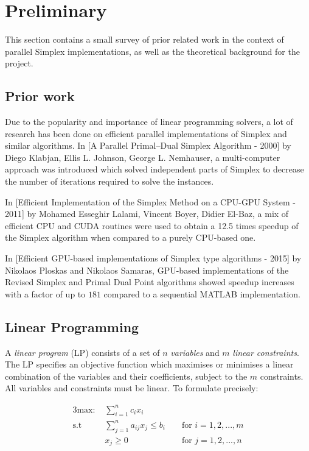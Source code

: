 \section{Preliminary}

This section contains a small survey of prior related work in the context of parallel Simplex implementations, as well as the theoretical background for the project.

\subsection{Prior work}\label{priorwork}
Due to the popularity and importance of linear programming solvers, a lot of research has been done on efficient parallel implementations of Simplex and similar algorithms. In [A Parallel Primal–Dual Simplex Algorithm - 2000] by Diego Klabjan, Ellis L. Johnson, George L. Nemhauser, a multi-computer approach was introduced which solved independent parts of Simplex to decrease the number of iterations required to solve the instances.

In [Efficient Implementation of the Simplex Method on a CPU-GPU System - 2011] by Mohamed Esseghir Lalami, Vincent Boyer, Didier El-Baz, a mix of efficient CPU and CUDA routines were used to obtain a 12.5 times speedup of the Simplex algorithm when compared to a purely CPU-based one.

In [Efficient GPU-based implementations of Simplex type algorithms - 2015] by Nikolaos Ploskas and Nikolaos Samaras, GPU-based implementations of the Revised Simplex and Primal Dual Point algorithms showed speedup increases with a factor of up to $181$ compared to a sequential MATLAB implementation.

\subsection{Linear Programming}
A \textit{linear program} (LP) consists of a set of $n$ \textit{variables} and $m$ \textit{linear constraints}. The LP specifies an objective function which maximises or minimises a linear combination of the variables and their coefficients, subject to the $m$ constraints. All variables and constraints must be linear. To formulate precisely:

\begin{alignat*}{3}
\text{max: } &\sum_{i=1}^{n} c_i x_i\\
\text{s.t }  & \sum_{j=1}^{n} a_{ij} x_j \leq b_i && \text{ for } i=1,2,...,m\\
& x_j \geq 0                         && \text{ for } j=1,2,...,n
\end{alignat*}

